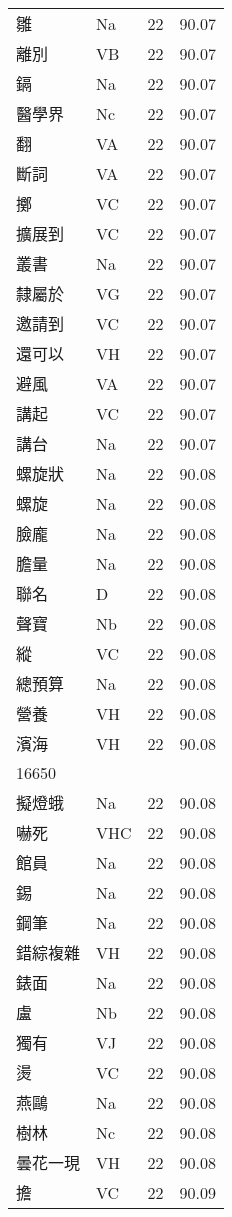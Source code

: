 \documentclass[twocolumn]{book}
\begin{document}
\begin{supertabular}{llrr}
雛 & Na & 22 &  90.07\\
離別 & VB & 22 &  90.07\\
鎘 & Na & 22 &  90.07\\
醫學界 & Nc & 22 &  90.07\\
翻 & VA & 22 &  90.07\\
斷詞 & VA & 22 &  90.07\\
擲 & VC & 22 &  90.07\\
擴展到 & VC & 22 &  90.07\\
叢書 & Na & 22 &  90.07\\
隸屬於 & VG & 22 &  90.07\\
邀請到 & VC & 22 &  90.07\\
還可以 & VH & 22 &  90.07\\
避風 & VA & 22 &  90.07\\
講起 & VC & 22 &  90.07\\
講台 & Na & 22 &  90.07\\
螺旋狀 & Na & 22 &  90.08\\
螺旋 & Na & 22 &  90.08\\
臉龐 & Na & 22 &  90.08\\
膽量 & Na & 22 &  90.08\\
聯名 & D & 22 &  90.08\\
聲寶 & Nb & 22 &  90.08\\
縱 & VC & 22 &  90.08\\
總預算 & Na & 22 &  90.08\\
營養 & VH & 22 &  90.08\\
濱海 & VH & 22 &  90.08\\
16650\\
擬燈蛾 & Na & 22 &  90.08\\
嚇死 & VHC & 22 &  90.08\\
館員 & Na & 22 &  90.08\\
錫 & Na & 22 &  90.08\\
鋼筆 & Na & 22 &  90.08\\
錯綜複雜 & VH & 22 &  90.08\\
錶面 & Na & 22 &  90.08\\
盧 & Nb & 22 &  90.08\\
獨有 & VJ & 22 &  90.08\\
燙 & VC & 22 &  90.08\\
燕鷗 & Na & 22 &  90.08\\
樹林 & Nc & 22 &  90.08\\
曇花一現 & VH & 22 &  90.08\\
擔 & VC & 22 &  90.09\\

\end{supertabular}
\end{document}
